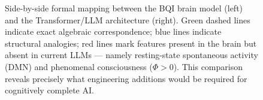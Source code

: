 \documentclass[12pt,a4paper]{article}
\theoremstyle{plain}
\theoremstyle{definition}
\theoremstyle{remark}
\begin{document}
\begin{figure}[H]
\caption{Side-by-side formal mapping between the BQI brain model (left) and the Transformer/LLM architecture (right).  Green dashed lines indicate exact algebraic correspondence; blue lines indicate structural analogies; red lines mark features present in the brain but absent in current LLMs — namely resting-state spontaneous activity (DMN) and phenomenal consciousness ($\Phi>0$).  This comparison reveals precisely what engineering additions would be required for cognitively complete AI.}
\label{fig:brain_transformer_map}
\end{figure}
\end{document}
